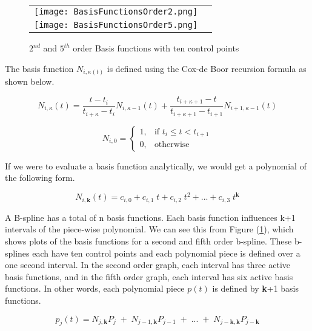 \documentclass{article}
\begin{document}
 \begin{figure}[h]
\begin{tabular}{ll}
\texttt{[image: BasisFunctionsOrder2.png]}
\\
\texttt{[image: BasisFunctionsOrder5.png]}
\end{tabular}
\caption{$2^{nd}$ and $5^{th}$ order Basis functions with ten control points}
\label{Fig:Open Basis Functions}
\end{figure}

  The basis function \(N_{i,\kappa(t)}\) is defined using the Cox-de Boor recursion formula as shown below.
  
  \begin{equation} \label{eq:Basis function equation}
  N_{i,\kappa}(t) = \frac{t - t_i}{t_{i+\kappa} - t_i} N_{i,\kappa-1}(t) + \frac{t_{i+\kappa+1} - t}{t_{i+\kappa+1}-t_{i+1}} N_{i+1 , \kappa-1}(t)    
  \end{equation}
  
    \begin{equation} \label{eq:Basis function equation zeros}
      N_{i,0} =   \begin{cases} 1, &  \text{if } t_i \leq t < t_{i+1} \\
                            0, & \text{otherwise} \end{cases}
  \end{equation}
  
  If we were to evaluate a basis function analytically, we would get a polynomial of the following form.
  
  \begin{equation}
      N_{i,\textbf{k}}(t) = c_{i,0} + c_{i,1} \; t + c_{i,2} \; t^{2} + ... + c_{i,3} \; t^{\textbf{k}}
  \end{equation}
  
  A B-spline has a total of n basis functions. Each basis function influences k+1 intervals of the piece-wise polynomial. We can see this from Figure (\ref{Fig:Open Basis Functions}), which shows plots of the basis functions for a second and fifth order b-spline. These b-splines each have ten control points and each polynomial piece is defined over a one second interval. In the second order graph, each interval has three active basis functions, and in the fifth order graph, each interval has six active basis functions. In other words, each polynomial piece \(p(t)\) is defined by \textbf{k}+1 basis functions. 
  
\begin{equation}
    p_j(t) = N_{j,\textbf{k}} P_{j} \; + \; N_{j-1,\textbf{k}} P_{j-1} \; + \; ... \; + \; N_{j-\textbf{k},\textbf{k}} P_{j-\textbf{k}}
\end{equation}
\end{document}
